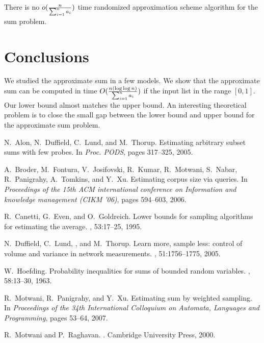 \documentclass[runningheads]{llncs}
\newcommand{\timecomplexity}{O({n(\log\log n)\over \sum_{i=1}^n a_i})}
\begin{document}
\begin{corollary}
There is no $o({n\over \sum_{i=1}^n a_i})$ time randomized
approximation scheme algorithm for the sum problem.
\end{corollary}



\section{Conclusions}

We studied the approximate sum in a few models. We show that the
approximate sum can be computed in time $\timecomplexity$ if the
input list in the range $[0,1]$. Our lower bound almost matches the
upper bound. An interesting theoretical problem is to close the
small gap between the lower bound and upper bound for the
approximate sum problem.




\begin{thebibliography}{1}

N.~Alon, N.~Duffield, C.~Lund, and M.~Thorup.
\newblock Estimating arbitrary subset sums with few probes.
\newblock In {\em Proc. PODS}, pages 317--325, 2005.

A.~Broder, M.~Fontura, V.~Josifovski, R.~Kumar, R.~Motwani,
S.~Nabar,
  R.~Panigrahy, A.~Tomkins, and Y.~Xu.
\newblock Estimating corpus size via queries.
\newblock In {\em Proceedings of the 15th ACM international conference on
  Information and knowledge management (CIKM '06)}, pages 594--603, 2006.

R.~Canetti, G.~Even, and O.~Goldreich.
\newblock Lower bounds for sampling algorithms for estimating the average.
, 53:17--25, 1995.

N.~Duffield, C.~Lund, , and M.~Thorup.
\newblock Learn more, sample less: control of volume and variance in network
  measurements.
, 51:1756--1775, 2005.

W.~Hoefding.
\newblock Probability inequalities for sums of bounded random variables.
, 58:13--30,
  1963.

R.~Motwani, R.~Panigrahy, and Y.~Xu.
\newblock Estimating sum by weighted sampling.
\newblock In {\em Proceedings of the 34th International Colloquium on Automata,
  Languages and Programming}, pages 53--64, 2007.

R.~Motwani and P.~Raghavan.
.
\newblock Cambridge University Press, 2000.

\end{thebibliography}
\end{document}
